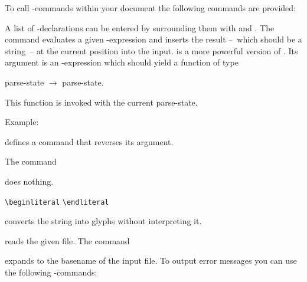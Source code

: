 To call \AL-commands within your document the following commands are provided\?:
\begin{code}
  \cs{\beginALdeclarations}  \cs{\endALdeclarations}

  \cs{\ALmacro} 

  \cs{\ALcommand} 
\end{code}
A list of \AL-declarations can be entered by surrounding them with \cs{\beginALdeclarations}
and \cs{\endALdeclarations}. The command \cs{\ALmacro} evaluates a given \AL-expression and
inserts the result --~which should be a string~-- at the current position into the input.
\cs{\ALcommand} is a more powerful version of \cs{\ALmacro}. Its argument is an \AL-expression
which should yield a function of type
\begin{display}
  \textsf{parse-state $\rightarrow$ parse-state}.
\end{display}
This function is invoked with the current \textsf{parse-state}.

\medskip
\noindent
Example\?:
\begin{code}
  \cs{\beginALdeclarations}

   \cs{:=}

  \qquad {} 

  \qquad {}

  \qquad\qquad {} 

  \qquad\qquad {}  

  \qquad {}

  \cs{\endALdeclarations}

\end{code}
defines a command \cs{\mirror} that reverses its argument.

The command
\begin{code}
  \cs{\relax}
\end{code}
does nothing.
\begin{code}
\texttt{\blue\textbackslash beginliteral}  \texttt{\blue\textbackslash endliteral}
\end{code}
converts the string into glyphs without interpreting it.
\begin{code}
  \cs{} 
\end{code}
reads the given file.
The command
\begin{code}
  \cs{\jobname}
\end{code}
expands to the basename of the input file.
To output error messages you can use the following \AL-commands\?:
\begin{code}
   

   
\end{code}



